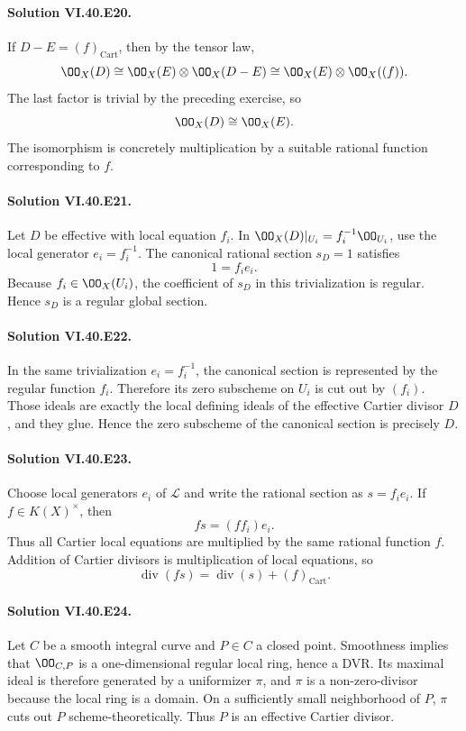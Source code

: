 \paragraph{Solution VI.40.E20.}
If \(D-E=(f)_{\mathrm{Cart}}\), then by the tensor law,
\[
\OO_X(D)
\cong \OO_X(E)\otimes\OO_X(D-E)
\cong \OO_X(E)\otimes\OO_X((f)).
\]
The last factor is trivial by the preceding exercise, so
\[
\OO_X(D)\cong\OO_X(E).
\]
The isomorphism is concretely multiplication by a suitable rational function corresponding to \(f\).

\paragraph{Solution VI.40.E21.}
Let \(D\) be effective with local equation \(f_i\).  In \(\OO_X(D)|_{U_i}=f_i^{-1}\OO_{U_i}\), use the local generator \(e_i=f_i^{-1}\).  The canonical rational section \(s_D=1\) satisfies
\[
1=f_i e_i.
\]
Because \(f_i\in\OO_X(U_i)\), the coefficient of \(s_D\) in this trivialization is regular.  Hence \(s_D\) is a regular global section.

\paragraph{Solution VI.40.E22.}
In the same trivialization \(e_i=f_i^{-1}\), the canonical section is represented by the regular function \(f_i\).  Therefore its zero subscheme on \(U_i\) is cut out by \((f_i)\).  Those ideals are exactly the local defining ideals of the effective Cartier divisor \(D\), and they glue.  Hence the zero subscheme of the canonical section is precisely \(D\).

\paragraph{Solution VI.40.E23.}
Choose local generators \(e_i\) of \(\mathcal L\) and write the rational section as \(s=f_i e_i\).  If \(f\in K(X)^\times\), then
\[
fs=(ff_i)e_i.
\]
Thus all Cartier local equations are multiplied by the same rational function \(f\).  Addition of Cartier divisors is multiplication of local equations, so
\[
\operatorname{div}(fs)=\operatorname{div}(s)+(f)_{\mathrm{Cart}}.
\]

\paragraph{Solution VI.40.E24.}
Let \(C\) be a smooth integral curve and \(P\in C\) a closed point.  Smoothness implies that \(\OO_{C,P}\) is a one-dimensional regular local ring, hence a DVR.  Its maximal ideal is therefore generated by a uniformizer \(\pi\), and \(\pi\) is a non-zero-divisor because the local ring is a domain.  On a sufficiently small neighborhood of \(P\), \(\pi\) cuts out \(P\) scheme-theoretically.  Thus \(P\) is an effective Cartier divisor.
